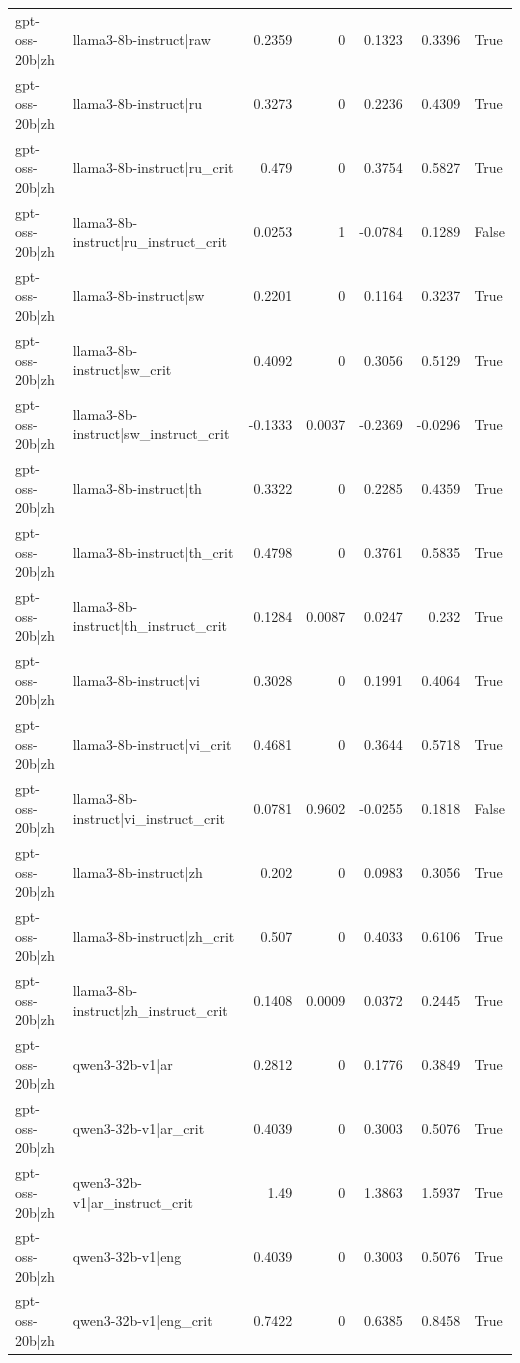 \begin{table}
\begin{tabular}{l l r r r r l}
gpt-oss-20b|zh & llama3-8b-instruct|raw & 0.2359 & 0 & 0.1323 & 0.3396 & True \\
gpt-oss-20b|zh & llama3-8b-instruct|ru & 0.3273 & 0 & 0.2236 & 0.4309 & True \\
gpt-oss-20b|zh & llama3-8b-instruct|ru_crit & 0.479 & 0 & 0.3754 & 0.5827 & True \\
gpt-oss-20b|zh & llama3-8b-instruct|ru_instruct_crit & 0.0253 & 1 & -0.0784 & 0.1289 & False \\
gpt-oss-20b|zh & llama3-8b-instruct|sw & 0.2201 & 0 & 0.1164 & 0.3237 & True \\
gpt-oss-20b|zh & llama3-8b-instruct|sw_crit & 0.4092 & 0 & 0.3056 & 0.5129 & True \\
gpt-oss-20b|zh & llama3-8b-instruct|sw_instruct_crit & -0.1333 & 0.0037 & -0.2369 & -0.0296 & True \\
gpt-oss-20b|zh & llama3-8b-instruct|th & 0.3322 & 0 & 0.2285 & 0.4359 & True \\
gpt-oss-20b|zh & llama3-8b-instruct|th_crit & 0.4798 & 0 & 0.3761 & 0.5835 & True \\
gpt-oss-20b|zh & llama3-8b-instruct|th_instruct_crit & 0.1284 & 0.0087 & 0.0247 & 0.232 & True \\
gpt-oss-20b|zh & llama3-8b-instruct|vi & 0.3028 & 0 & 0.1991 & 0.4064 & True \\
gpt-oss-20b|zh & llama3-8b-instruct|vi_crit & 0.4681 & 0 & 0.3644 & 0.5718 & True \\
gpt-oss-20b|zh & llama3-8b-instruct|vi_instruct_crit & 0.0781 & 0.9602 & -0.0255 & 0.1818 & False \\
gpt-oss-20b|zh & llama3-8b-instruct|zh & 0.202 & 0 & 0.0983 & 0.3056 & True \\
gpt-oss-20b|zh & llama3-8b-instruct|zh_crit & 0.507 & 0 & 0.4033 & 0.6106 & True \\
gpt-oss-20b|zh & llama3-8b-instruct|zh_instruct_crit & 0.1408 & 0.0009 & 0.0372 & 0.2445 & True \\
gpt-oss-20b|zh & qwen3-32b-v1|ar & 0.2812 & 0 & 0.1776 & 0.3849 & True \\
gpt-oss-20b|zh & qwen3-32b-v1|ar_crit & 0.4039 & 0 & 0.3003 & 0.5076 & True \\
gpt-oss-20b|zh & qwen3-32b-v1|ar_instruct_crit & 1.49 & 0 & 1.3863 & 1.5937 & True \\
gpt-oss-20b|zh & qwen3-32b-v1|eng & 0.4039 & 0 & 0.3003 & 0.5076 & True \\
gpt-oss-20b|zh & qwen3-32b-v1|eng_crit & 0.7422 & 0 & 0.6385 & 0.8458 & True \\

\end{tabular}
\end{table}

